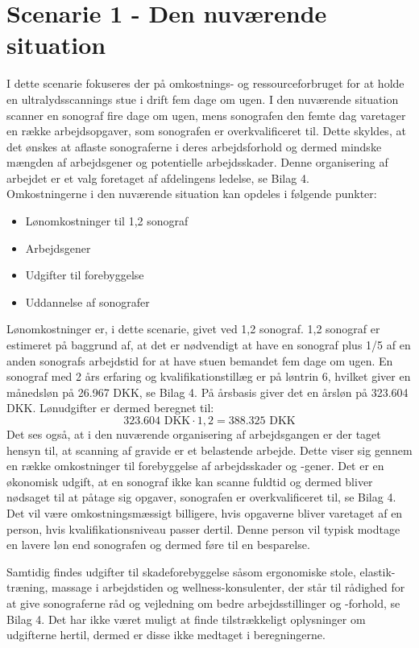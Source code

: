 \section{Scenarie 1 - Den nuværende situation} \label{nuvaerende}
I dette scenarie fokuseres der på omkostnings- og ressourceforbruget for at holde en ultralydsscannings stue i drift fem dage om ugen. I den nuværende situation scanner en sonograf fire dage om ugen, mens sonografen den femte dag varetager en række arbejdsopgaver, som sonografen er overkvalificeret til. Dette skyldes, at det ønskes at aflaste sonograferne i deres arbejdsforhold og dermed mindske mængden af arbejdsgener og potentielle arbejdsskader. Denne organisering af arbejdet er et valg foretaget af afdelingens ledelse, se Bilag 4. \\ 
Omkostningerne i den nuværende situation kan opdeles i følgende punkter:

\begin{itemize}
\item Lønomkostninger til 1,2 sonograf
\item Arbejdsgener 
\item Udgifter til forebyggelse
\item Uddannelse af sonografer
\end{itemize}
Lønomkostninger er, i dette scenarie, givet ved 1,2 sonograf. 1,2 sonograf er estimeret på baggrund af, at det er nødvendigt at have en sonograf plus 1/5 af en anden sonografs arbejdstid for at have stuen bemandet fem dage om ugen. En sonograf med 2 års erfaring og kvalifikationstillæg er på løntrin 6, hvilket giver en månedsløn på 26.967 DKK, se Bilag 4. På årsbasis giver det en årsløn på 323.604 DKK. Lønudgifter er dermed beregnet til:
\begin{equation}
323.604 \text{ DKK}\cdot1,2 = 388.325 \text{ DKK}
\end{equation}
Det ses også, at i den nuværende organisering af arbejdsgangen er der taget hensyn til, at scanning af gravide er et belastende arbejde. Dette viser sig gennem en række omkostninger til forebyggelse af arbejdsskader og -gener. Det er en økonomisk udgift, at en sonograf ikke kan scanne fuldtid og dermed bliver nødsaget til at påtage sig opgaver, sonografen er overkvalificeret til, se Bilag 4. Det vil være omkostningsmæssigt billigere, hvis opgaverne bliver varetaget af en person, hvis kvalifikationsniveau passer dertil. Denne person vil typisk modtage en lavere løn end sonografen og dermed føre til en besparelse.

Samtidig findes udgifter til skadeforebyggelse såsom ergonomiske stole, elastik-træning, massage i arbejdstiden og wellness-konsulenter, der står til rådighed for at give sonograferne råd og vejledning om bedre arbejdsstillinger og -forhold, se Bilag 4. Det har ikke været muligt at finde tilstrækkeligt oplysninger om udgifterne hertil, dermed er disse ikke medtaget i beregningerne. 

